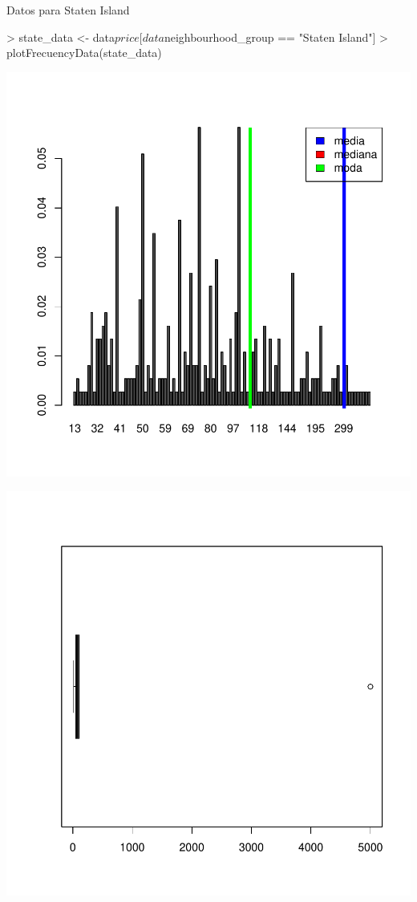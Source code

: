 \documentclass [a4paper] {article}
\begin{document}
\begin{center}
Datos para Staten Island
\begin{center}
\begin{Schunk}
\begin{Sinput}
> state_data <- data$price[data$neighbourhood_group == "Staten Island"]
> plotFrecuencyData(state_data)
\end{Sinput}
\end{Schunk}
\includegraphics{entrega-037}
\end{center}
\begin{center}
\includegraphics{entrega-038}
\end{center}

\end{center}
\end{document}
